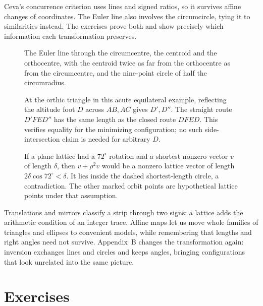 Ceva's concurrence criterion uses lines and signed ratios, so it survives affine changes of coordinates. The Euler line also involves the circumcircle, tying it to similarities instead. The exercises prove both and show precisely which information each transformation preserves.

\begin{figure}[ht]
\centering
{}
\caption{The Euler line through the circumcentre, the centroid and the orthocentre, with the centroid twice as far from the orthocentre as from the circumcentre, and the nine-point circle of half the circumradius.}
\label{geometry:fig:euler}
\end{figure}

\begin{figure}[ht]
\centering
{}
\caption{At the orthic triangle in this acute equilateral example, reflecting the altitude foot $D$ across $AB,AC$ gives $D',D''$. The straight route $D'\!F\!E\!D''$ has the same length as the closed route $D\!F\!E\!D$. This verifies equality for the minimizing configuration; no such side-intersection claim is needed for arbitrary $D$.}
\label{fig:v9-orthic-unfolding}
\end{figure}

\begin{figure}[ht]
\centering
{}
\caption{If a plane lattice had a $72^\circ$ rotation and a shortest nonzero vector $v$ of length $\delta$, then $v+\rho^2v$ would be a nonzero lattice vector of length $2\delta\cos72^\circ<\delta$. It lies inside the dashed shortest-length circle, a contradiction. The other marked orbit points are hypothetical lattice points under that assumption.}
\label{fig:v9-fivefold-obstruction}
\end{figure}

Translations and mirrors classify a strip through two signs; a lattice adds the arithmetic condition of an integer trace. Affine maps let us move whole families of triangles and ellipses to convenient models, while remembering that lengths and right angles need not survive. Appendix~B changes the transformation again: inversion exchanges lines and circles and keeps angles, bringing configurations that look unrelated into the same picture.

\section{Exercises}

